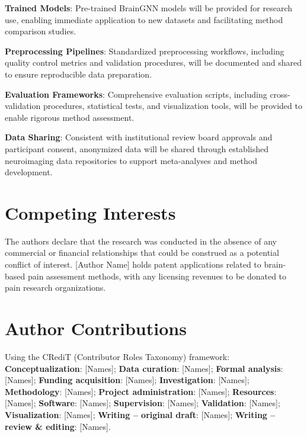 \textbf{Trained Models}: Pre-trained BrainGNN models will be provided for research use, enabling immediate application to new datasets and facilitating method comparison studies.

\textbf{Preprocessing Pipelines}: Standardized preprocessing workflows, including quality control metrics and validation procedures, will be documented and shared to ensure reproducible data preparation.

\textbf{Evaluation Frameworks}: Comprehensive evaluation scripts, including cross-validation procedures, statistical tests, and visualization tools, will be provided to enable rigorous method assessment.

\textbf{Data Sharing}: Consistent with institutional review board approvals and participant consent, anonymized data will be shared through established neuroimaging data repositories to support meta-analyses and method development.

\section*{Competing Interests}

The authors declare that the research was conducted in the absence of any commercial or financial relationships that could be construed as a potential conflict of interest. [Author Name] holds patent applications related to brain-based pain assessment methods, with any licensing revenues to be donated to pain research organizations.

\section*{Author Contributions}

Using the CRediT (Contributor Roles Taxonomy) framework:
\textbf{Conceptualization}: [Names]; \textbf{Data curation}: [Names]; \textbf{Formal analysis}: [Names]; \textbf{Funding acquisition}: [Names]; \textbf{Investigation}: [Names]; \textbf{Methodology}: [Names]; \textbf{Project administration}: [Names]; \textbf{Resources}: [Names]; \textbf{Software}: [Names]; \textbf{Supervision}: [Names]; \textbf{Validation}: [Names]; \textbf{Visualization}: [Names]; \textbf{Writing -- original draft}: [Names]; \textbf{Writing -- review \& editing}: [Names].




